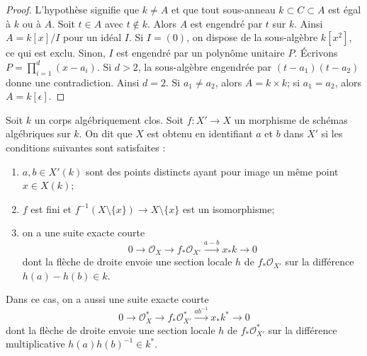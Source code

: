 \begin{proof}
L'hypothèse signifie que $k \not = A$ et que tout sous-anneau $k \subset C \subset A$ est égal à $k$ ou à $A$. Soit $t \in A$ avec $t \not \in k$. Alors $A$ est engendré par $t$ sur $k$. Ainsi $A = k[x]/I$ pour un idéal $I$. Si $I = (0)$, on dispose de la sous-algèbre $k[x^2]$, ce qui est exclu. Sinon, $I$ est engendré par un polynôme unitaire $P$. Écrivons $P = \prod_{i = 1}^d (x - a_i)$. Si $d > 2$, la sous-algèbre engendrée par $(t - a_1)(t - a_2)$ donne une contradiction. Ainsi $d = 2$. Si $a_1 \not = a_2$, alors $A = k \times k$; si $a_1 = a_2$, alors $A = k[\epsilon]$.
\end{proof}

\begin{example} \label{example-glue-points} Soit $k$ un corps algébriquement clos. Soit $f : X' \to X$ un morphisme de schémas algébriques sur $k$. On dit que $X$ est obtenu en identifiant $a$ et $b$ dans $X'$ si les conditions suivantes sont satisfaites : \begin{enumerate} \item $a, b \in X'(k)$ sont des points distincts ayant pour image un même point $x \in X(k)$; \item $f$ est fini et $f^{-1}(X \setminus \{x\}) \to X \setminus \{x\}$ est un isomorphisme; \item on a une suite exacte courte $$
0 \to \mathcal{O}_X \to f_*\mathcal{O}_{X'} \xrightarrow{a - b} x_*k \to 0
$$ dont la flèche de droite envoie une section locale $h$ de $f_*\mathcal{O}_{X'}$ sur la différence $h(a) - h(b) \in k$. \end{enumerate} Dans ce cas, on a aussi une suite exacte courte $$
0 \to \mathcal{O}_X^* \to f_*\mathcal{O}_{X'}^*
\xrightarrow{ab^{-1}} x_*k^* \to 0
$$ dont la flèche de droite envoie une section locale $h$ de $f_*\mathcal{O}_{X'}^*$ sur la différence multiplicative $h(a)h(b)^{-1} \in k^*$.
\end{example}

